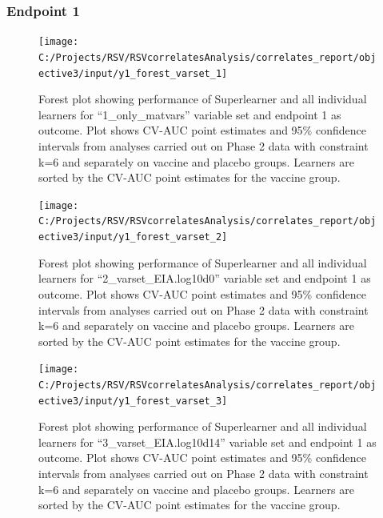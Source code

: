 \documentclass[11pt]{article}
\begin{document}
\hypertarget{endpoint-1}{%
\subsubsection{Endpoint 1}\label{endpoint-1}}

\begin{figure}[H]

{\centering \texttt{[image: C:/Projects/RSV/RSVcorrelatesAnalysis/correlates\_report/objective3/input/y1\_forest\_varset\_1]} 

}

\caption[Forest plot for ``1\_only\_matvars'' variable set, endpoint 1.]{\label{fig:obj3Appendix1}Forest plot showing performance of Superlearner and all individual learners for ``1\_only\_matvars'' variable set and endpoint 1 as outcome. Plot shows CV-AUC point estimates and 95\% confidence intervals from analyses carried out on Phase 2 data with constraint k=6 and separately on vaccine and placebo groups. Learners are sorted by the CV-AUC point estimates for the vaccine group.}\label{fig:y1-forest-varset-1}
\end{figure}

\begin{figure}[H]

{\centering \texttt{[image: C:/Projects/RSV/RSVcorrelatesAnalysis/correlates\_report/objective3/input/y1\_forest\_varset\_2]} 

}

\caption[Forest plot for ``2\_varset\_EIA.log10d0'' variable set, endpoint 1.]{Forest plot showing performance of Superlearner and all individual learners for ``2\_varset\_EIA.log10d0'' variable set and endpoint 1 as outcome. Plot shows CV-AUC point estimates and 95\% confidence intervals from analyses carried out on Phase 2 data with constraint k=6 and separately on vaccine and placebo groups. Learners are sorted by the CV-AUC point estimates for the vaccine group.}\label{fig:y1-forest-varset-2}
\end{figure}

\begin{figure}[H]

{\centering \texttt{[image: C:/Projects/RSV/RSVcorrelatesAnalysis/correlates\_report/objective3/input/y1\_forest\_varset\_3]} 

}

\caption[Forest plot for ``3\_varset\_EIA.log10d14'' variable set, endpoint 1.]{Forest plot showing performance of Superlearner and all individual learners for ``3\_varset\_EIA.log10d14'' variable set and endpoint 1 as outcome. Plot shows CV-AUC point estimates and 95\% confidence intervals from analyses carried out on Phase 2 data with constraint k=6 and separately on vaccine and placebo groups. Learners are sorted by the CV-AUC point estimates for the vaccine group.}\label{fig:y1-forest-varset-3}
\end{figure}
\end{document}
